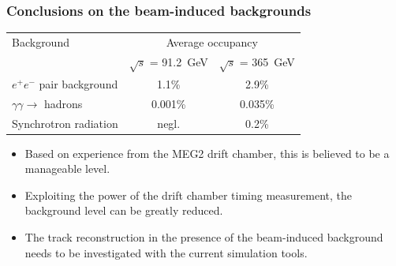\documentclass[aspectratio=169, hyperref={colorlinks=true,pdfpagelabels=false,linkcolor=black}, xcolor=dvipsnames,10pt]{beamer}
\begin{document}
\begin{frame}
  \frametitle{Conclusions on the beam-induced backgrounds}

  \centering
  \begin{adjustbox}{max width=\textwidth}
    \begin{tabular}{l c c}
      \toprule
       Background & \multicolumn{2}{c}{Average occupancy} \\
        & $\sqrt{s}$ = 91.2~GeV & $\sqrt{s}$ = 365~GeV \\
       \midrule
       $e^+e^-$ pair background & 1.1\% & 2.9\% \\
       $\gamma\gamma\rightarrow$ hadrons & 0.001\% & 0.035\%  \\
       Synchrotron radiation & negl. & 0.2\% \\
       \bottomrule
    \end{tabular}
  \end{adjustbox}

  \vspace{0.8cm}

  \begin{itemize}
    \item Based on experience from the MEG2 drift chamber, this is believed to be a manageable level.
    \item Exploiting the power of the drift chamber timing measurement, the background level can be greatly reduced.
    \item The track reconstruction in the presence of the beam-induced background needs to be investigated with the current simulation tools.
  \end{itemize}

\end{frame}
\end{document}
